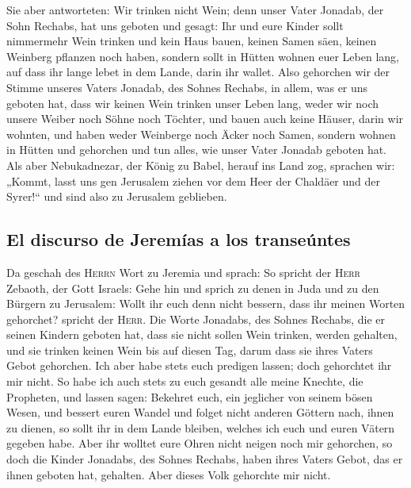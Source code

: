  Sie aber antworteten: Wir trinken nicht Wein; denn unser
Vater Jonadab, der Sohn Rechabs, hat uns geboten und gesagt: Ihr und
eure Kinder sollt nimmermehr Wein trinken  und kein Haus
bauen, keinen Samen säen, keinen Weinberg pflanzen noch haben, sondern
sollt in Hütten wohnen euer Leben lang, auf dass ihr lange lebet in dem
Lande, darin ihr wallet.  Also gehorchen wir der Stimme
unseres Vaters Jonadab, des Sohnes Rechabs, in allem, was er uns geboten
hat, dass wir keinen Wein trinken unser Leben lang, weder wir noch
unsere Weiber noch Söhne noch Töchter,  und bauen auch
keine Häuser, darin wir wohnten, und haben weder Weinberge noch Äcker
noch Samen,  sondern wohnen in Hütten und gehorchen und
tun alles, wie unser Vater Jonadab geboten hat.  Als aber
Nebukadnezar, der König zu Babel, herauf ins Land zog, sprachen wir:
„Kommt, lasst uns gen Jerusalem ziehen vor dem Heer der Chaldäer und der
Syrer!{}`` und sind also zu Jerusalem geblieben.

\hypertarget{el-discurso-de-jeremuxedas-a-los-transeuxfantes}{%
\subsection{El discurso de Jeremías a los
transeúntes}\label{el-discurso-de-jeremuxedas-a-los-transeuxfantes}}

 Da geschah des \textsc{Herrn} Wort zu Jeremia und
sprach:  So spricht der \textsc{Herr} Zebaoth, der Gott
Israels: Gehe hin und sprich zu denen in Juda und zu den Bürgern zu
Jerusalem: Wollt ihr euch denn nicht bessern, dass ihr meinen Worten
gehorchet? spricht der \textsc{Herr}.  Die Worte
Jonadabs, des Sohnes Rechabs, die er seinen Kindern geboten hat, dass
sie nicht sollen Wein trinken, werden gehalten, und sie trinken keinen
Wein bis auf diesen Tag, darum dass sie ihres Vaters Gebot gehorchen.
Ich aber habe stets euch predigen lassen; doch gehorchtet ihr mir nicht.
 So habe ich auch stets zu euch gesandt alle meine
Knechte, die Propheten, und lassen sagen: Bekehret euch, ein jeglicher
von seinem bösen Wesen, und bessert euren Wandel und folget nicht
anderen Göttern nach, ihnen zu dienen, so sollt ihr in dem Lande
bleiben, welches ich euch und euren Vätern gegeben habe. Aber ihr
wolltet eure Ohren nicht neigen noch mir gehorchen,  so
doch die Kinder Jonadabs, des Sohnes Rechabs, haben ihres Vaters Gebot,
das er ihnen geboten hat, gehalten. Aber dieses Volk gehorchte mir
nicht.

